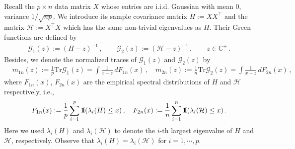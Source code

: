 \documentclass[12pt]{article}
\numberwithin{equation}{section}
\theoremstyle{remark}
\newcommand{\1}{{\rm 1}\kern-0.24em{\rm I}}
\begin{document}
 Recall  the $p\times n$ data matrix ${X}$ whose entries are i.i.d. Gaussian with mean $0$, variance $1/\sqrt{np}$. We introduce its sample covariance matrix $H:=  {X}{X}^{\top} $ and  the matrix $\mathcal{H}:= {X}^{\top}{X}$ which has the same non-trivial eigenvalues as $H$. Their Green functions  are defined by 
\begin{align*}
\mathcal{G}_1(z):= (H - z)^{-1}\,, \qquad   \mathcal{G}_2(z):= (\mathcal{H} - z)^{-1}\,, \qquad  z\in \mathbb{C}^+\,.
\end{align*}
Besides, we denote the normalized  traces of $\mathcal{G}_{1}(z)$ and $\mathcal{G}_{2}(z)$ by 
\begin{align*}
&m_{1n}(z):=\frac{1}{p}\text{Tr}\mathcal{G}_1(z)=\int\frac{1}{x-z}\,dF_{1n}(x)\,,\quad m_{2n}(z):=\frac{1}{n}\text{Tr}\mathcal{G}_2(z)= \int \frac{1}{x-z}\,dF_{2n}(x)\,,
\end{align*}
where  $F_{1n}(x)$, $F_{2n}(x)$ are the empirical spectral distributions of $H$ and $\mathcal{H}$ respectively, i.e.,
\begin{align}
F_{1n}(x):=\frac{1}{p}\sum_{i=1}^p \1(\lambda_i(H)\leq x)\,, \quad F_{2n}(x):=\frac{1}{n}\sum_{i=1}^n\1(\lambda_i(\mathcal{H})\leq x)\,. \nonumber
\end{align}
Here we used $\lambda_i(H)$ and $\lambda_i(\mathcal{H})$  to denote the $i$-th largest eigenvalue of $H$ and $\mathcal{H}$, respectively. Observe that $\lambda_i(H)=\lambda_i(\mathcal{H})$ for $i=1,\cdots, p$. 
\end{document}
